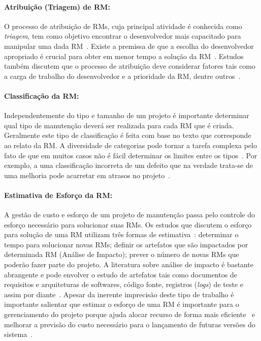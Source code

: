 \paragraph{Atribuição (Triagem) de RM:}

O processo de atribuição de RMs, cuja principal atividade é conhecida como
\textit{triagem}, tem como objetivo encontrar o desenvolvedor mais capacitado
para manipular uma dada RM~\cite{cavalcanti2014challenges}. Existe a premissa de
que a escolha do desenvolvedor apropriado é crucial para obter em menor tempo a
so\-lu\-ção da RM~\cite{di2002approach}. Estudos também discutem que o processo
de atribuição deve considerar fatores tais como a carga de trabalho do
desenvolvedor e a prioridade da RM, dentre outros~\cite{aljarah2011selecting}.

\paragraph{Classificação da RM:}

Independentemente do tipo e tamanho de um projeto é importante determinar qual
tipo de manutenção deverá ser realizada para cada RM que é criada. Geralmente
este tipo de classificação é feita com base no texto que corresponde ao relato
da RM\@. A diversidade de categorias pode tornar a tarefa complexa pelo fato de
que em muitos casos não é fácil determinar os limites entre os
tipos~\cite{antoniol2008bug}. Por exemplo, a uma classificação incorreta de um
defeito que na verdade trata-se de uma melhoria pode acarretar em atrasos no
projeto~\cite{cavalcanti2014challenges}.

\paragraph{Estimativa de Esforço da RM:}

A gestão de custo e esforço de um projeto de manutenção passa pelo controle do
esforço necessário para solucionar suas RMs. Os estudos que discutem o esforço
para solução de uma RM utilizam três formas de
estimativa~\cite{cavalcanti2014challenges}: determinar o tempo para solucionar
novas RMs; definir os artefatos que são impactados por determinada RM (Análise
de Impacto); prever o número de novas RMs que poderão fazer parte do projeto. A
literatura sobre análise de impacto é bastante abrangente e pode envolver o
estudo de artefatos tais como documentos de requisitos e arquiteturas de
softwares, código fonte, registros (\textit{logs}) de teste e assim por
diante~\cite{cavalcanti2014challenges}. Apesar da inerente imprecisão deste
tipo de trabalho é importante salientar que estimar o esforço de uma RM é
importante para o gerenciamento do projeto porque ajuda alocar recurso de forma
mais eficiente~\cite{Bhattacharya:2011:BTP:1985441.1985472} e melhorar a
previsão do custo necessário para o lançamento de futuras versões do
sistema~\cite{Vijayakumar2014}.

